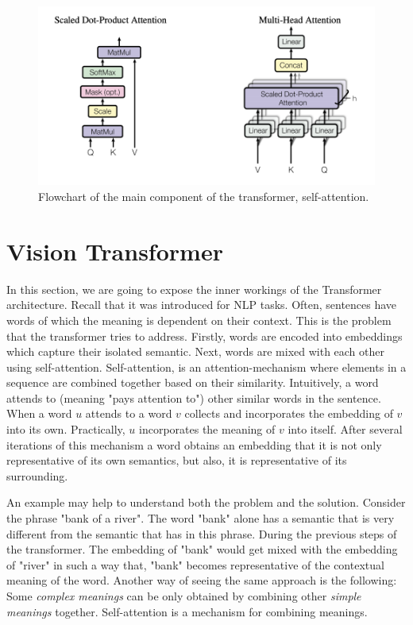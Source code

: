 
\begin{figure}[h]
    \centering
    \includegraphics[width=.9\linewidth]{figs/selfattention.png}
    \caption{Flowchart of the main component of the transformer, self-attention.}
    \label{fig:selfattention}
\end{figure}


\section{Vision Transformer}\label{sects:Transformer}

In this section, we are going to expose the inner workings of the Transformer architecture. Recall that it was introduced for NLP tasks. Often, sentences have words of which the meaning is dependent on their context. This is the problem that the transformer tries to address. Firstly, words are encoded into embeddings which capture their isolated semantic. Next, words are mixed with each other using self-attention. Self-attention, is an attention-mechanism where elements in a sequence are combined together based on their similarity. Intuitively, a word attends to (meaning "pays attention to") other similar words in the sentence. When a word $u$ attends to a word $v$ collects and incorporates the embedding of $v$ into its own. Practically, $u$ incorporates the meaning of $v$ into itself. After several iterations of this mechanism a word obtains an embedding that it is not only representative of its own semantics, but also, it is representative of its surrounding. 

An example may help to understand both the problem and the solution. Consider the phrase "bank of a river". The word "bank" alone has a semantic that is very different from the semantic that has in this phrase. During the previous steps of the transformer. The embedding of "bank" would get mixed with the embedding of "river" in such a way that, "bank" becomes representative of the contextual meaning of the word. Another way of seeing the same approach is the following: Some \textit{complex meanings} can be only obtained by combining other \textit{simple meanings} together. Self-attention is a mechanism for combining meanings.

